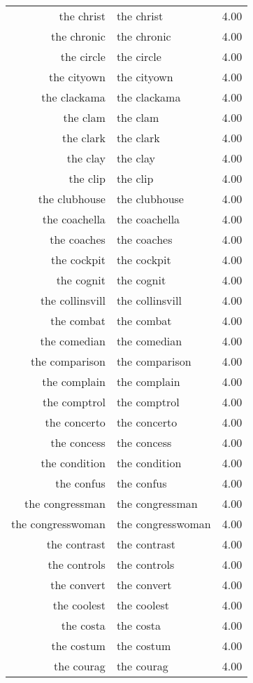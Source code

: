 \begin{table}[ht]
\begin{tabular}{rlr}
  the christ & the christ & 4.00 \\ 
  the chronic & the chronic & 4.00 \\ 
  the circle & the circle & 4.00 \\ 
  the cityown & the cityown & 4.00 \\ 
  the clackama & the clackama & 4.00 \\ 
  the clam & the clam & 4.00 \\ 
  the clark & the clark & 4.00 \\ 
  the clay & the clay & 4.00 \\ 
  the clip & the clip & 4.00 \\ 
  the clubhouse & the clubhouse & 4.00 \\ 
  the coachella & the coachella & 4.00 \\ 
  the coaches & the coaches & 4.00 \\ 
  the cockpit & the cockpit & 4.00 \\ 
  the cognit & the cognit & 4.00 \\ 
  the collinsvill & the collinsvill & 4.00 \\ 
  the combat & the combat & 4.00 \\ 
  the comedian & the comedian & 4.00 \\ 
  the comparison & the comparison & 4.00 \\ 
  the complain & the complain & 4.00 \\ 
  the comptrol & the comptrol & 4.00 \\ 
  the concerto & the concerto & 4.00 \\ 
  the concess & the concess & 4.00 \\ 
  the condition & the condition & 4.00 \\ 
  the confus & the confus & 4.00 \\ 
  the congressman & the congressman & 4.00 \\ 
  the congresswoman & the congresswoman & 4.00 \\ 
  the contrast & the contrast & 4.00 \\ 
  the controls & the controls & 4.00 \\ 
  the convert & the convert & 4.00 \\ 
  the coolest & the coolest & 4.00 \\ 
  the costa & the costa & 4.00 \\ 
  the costum & the costum & 4.00 \\ 
  the courag & the courag & 4.00 \\ 

\end{tabular}
\end{table}
